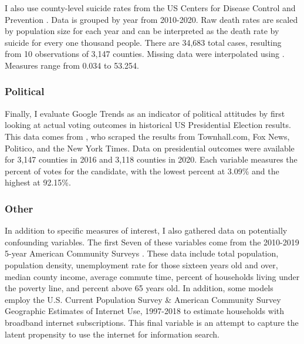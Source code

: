 I also use county-level suicide rates from the US Centers for Disease Control
and Prevention \citeyearpar{suic_data}. Data is grouped by year from 2010-2020.
Raw death rates are scaled by population size for each year and can be
interpreted as the death rate by suicide for every one thousand people. There
are 34,683 total cases, resulting from 10 observations of 3,147 counties.
Missing data were interpolated using \citet{zoo}. Measures range from 0.034 to
53.254.

\subsubsection{Political}

Finally, I evaluate Google Trends as an indicator of political attitudes by
first looking at actual voting outcomes in historical US Presidential Election
results. This data comes from  \citet{pres_data}, who scraped the results from
Townhall.com, Fox News, Politico, and the New York Times. Data on presidential
outcomes were available for 3,147 counties in 2016 and 3,118 counties in 2020.
Each variable measures the percent of votes for the candidate, with the lowest
percent at 3.09\% and the highest at 92.15\%.



\subsubsection{Other}

In addition to specific measures of interest, I also gathered data on
potentially confounding variables. The first Seven of these variables come from
the 2010-2019 5-year American Community Surveys \citep{acs2019, acs2018,
acs2017, acs2016, acs2015, acs2014, acs2013, acs2012, acs2011, acs2010}. These
data include total population, population density, unemployment rate for those
sixteen years old and over, median county income, average commute time, percent
of households living under the poverty line, and percent above 65 years old. In
addition, some models employ the U.S. Current Population Survey \& American
Community Survey Geographic Estimates of Internet Use, 1997-2018
\citep{internet_use} to estimate households with broadband internet
subscriptions. This final variable is an attempt to capture the latent
propensity to use the internet for information search.

